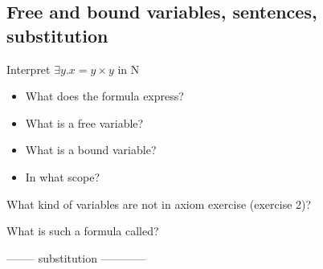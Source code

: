 \documentclass[fleqn]{article}
\begin{document}
\subsection{Free and bound variables, sentences, substitution}
\begin{enumerate}
    \item Interpret $\exists y. x=y\times y$ in N
    \begin{itemize}
        \item What does the formula express?
        \item What is a free variable?
        \item What is a bound variable?
        \item In what scope?
    \end{itemize}
    {\color{red}\item What kind of variables are not in axiom exercise (exercise 2)?}
    {\color{red}\item What is such a formula called?}
    \item -------- substitution ------------
\end{enumerate}
\end{document}
